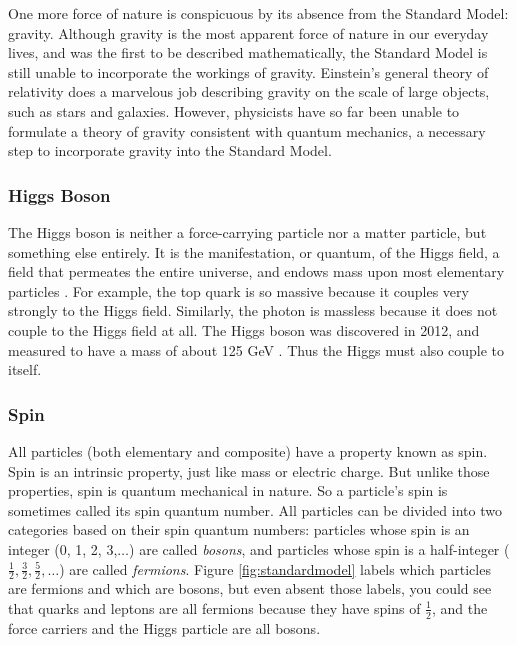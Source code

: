One more force of nature is conspicuous by its absence from the
Standard Model: gravity. Although gravity is the most apparent force
of nature in our everyday lives, and was the first to be described
mathematically, the Standard Model is still unable to incorporate the
workings of gravity. Einstein's general theory of relativity does a
marvelous job describing gravity on the scale of large objects, such
as stars and galaxies. However, physicists have so far been unable to
formulate a theory of gravity consistent with quantum mechanics, a
necessary step to incorporate gravity into the Standard Model.

\subsubsection*{Higgs Boson}
The Higgs boson is neither a force-carrying particle nor a matter particle, but
something else entirely. It is the manifestation, or quantum, of the
Higgs field, a field that permeates the entire universe, and endows
mass upon most elementary particles \cite{broutenglert,higgs,ghk}.
For example, the top quark is so massive
because it couples very strongly to the Higgs field. Similarly, the
photon is massless because it does not couple to the Higgs field at all.
The Higgs boson was discovered in 2012, and measured to have a mass
of about 125 GeV \cite{jointhiggs}. Thus the Higgs must also couple to itself.

\subsubsection*{Spin}
All particles (both elementary and composite) have
a property known as spin. Spin is an intrinsic property, just like
mass or electric charge. But unlike those properties, spin is quantum
mechanical in nature. So a particle's spin is sometimes called its
spin quantum number. All particles can be divided into two categories
based on their spin quantum numbers: particles whose spin is an
integer (0, 1, 2, 3,$\ldots$) are called \emph{bosons}, and particles whose
spin is a half-integer ($\frac{1}{2}, \frac{3}{2}, \frac{5}{2},\ldots$)
are called \emph{fermions}. Figure \ref{fig:standardmodel}
labels which particles are fermions and which are bosons, but even
absent those labels, you could see that quarks and leptons are all
fermions because they have spins of $\frac{1}{2}$, and the force
carriers and the Higgs particle are all bosons.

